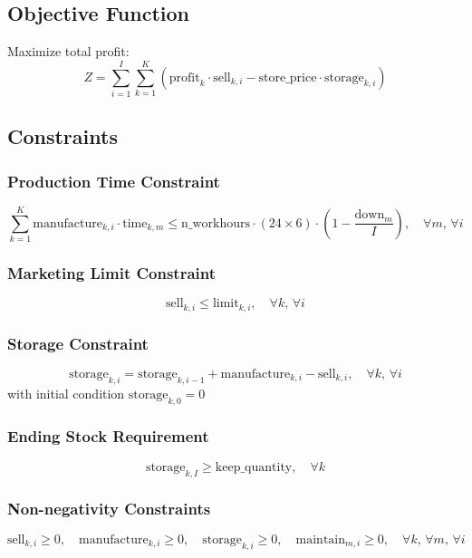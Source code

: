 \documentclass{article}
\begin{document}
\subsection*{Objective Function}
Maximize total profit:
\[
Z = \sum_{i=1}^{I} \sum_{k=1}^{K} \left( \text{profit}_{k} \cdot \text{sell}_{k,i} - \text{store\_price} \cdot \text{storage}_{k,i} \right)
\]

\subsection*{Constraints}

\subsubsection*{Production Time Constraint}
\[
\sum_{k=1}^{K} \text{manufacture}_{k,i} \cdot \text{time}_{k,m} \leq \text{n\_workhours} \cdot (24 \times 6) \cdot (1 - \frac{\text{down}_{m}}{I}), \quad \forall m, \, \forall i
\]

\subsubsection*{Marketing Limit Constraint}
\[
\text{sell}_{k,i} \leq \text{limit}_{k,i}, \quad \forall k, \, \forall i
\]

\subsubsection*{Storage Constraint}
\[
\text{storage}_{k,i} = \text{storage}_{k,i-1} + \text{manufacture}_{k,i} - \text{sell}_{k,i}, \quad \forall k, \, \forall i
\]
with initial condition \( \text{storage}_{k,0} = 0 \)

\subsubsection*{Ending Stock Requirement}
\[
\text{storage}_{k,I} \geq \text{keep\_quantity}, \quad \forall k
\]

\subsubsection*{Non-negativity Constraints}
\[
\text{sell}_{k,i} \geq 0, \quad \text{manufacture}_{k,i} \geq 0, \quad \text{storage}_{k,i} \geq 0, \quad \text{maintain}_{m,i} \geq 0, \quad \forall k, \, \forall m, \, \forall i
\]
\end{document}
